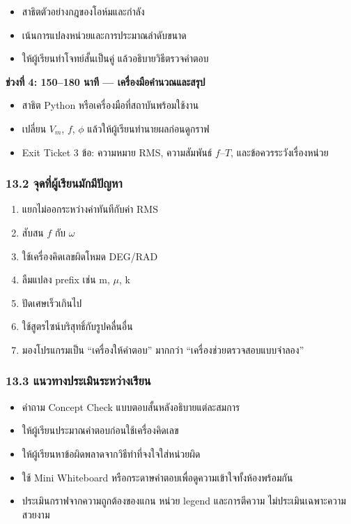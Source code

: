 \begin{itemize}
    \item สาธิตตัวอย่างกฎของโอห์มและกำลัง
    \item เน้นการแปลงหน่วยและการประมาณลำดับขนาด
    \item ให้ผู้เรียนทำโจทย์สั้นเป็นคู่ แล้วอธิบายวิธีตรวจคำตอบ
\end{itemize}

\textbf{ช่วงที่ 4: 150–180 นาที — เครื่องมือคำนวณและสรุป}

\begin{itemize}
    \item สาธิต Python หรือเครื่องมือที่สถาบันพร้อมใช้งาน
    \item เปลี่ยน $V_m$, $f$, $\phi$ แล้วให้ผู้เรียนทำนายผลก่อนดูกราฟ
    \item Exit Ticket 3 ข้อ: ความหมาย RMS, ความสัมพันธ์ $f$–$T$, และข้อควรระวังเรื่องหน่วย
\end{itemize}

\subsubsection{13.2 จุดที่ผู้เรียนมักมีปัญหา}

\begin{enumerate}
    \item แยกไม่ออกระหว่างค่าทันทีกับค่า RMS
    \item สับสน $f$ กับ $\omega$
    \item ใช้เครื่องคิดเลขผิดโหมด DEG/RAD
    \item ลืมแปลง prefix เช่น m, $\mu$, k
    \item ปัดเศษเร็วเกินไป
    \item ใช้สูตรไซน์บริสุทธิ์กับรูปคลื่นอื่น
    \item มองโปรแกรมเป็น “เครื่องให้คำตอบ” มากกว่า “เครื่องช่วยตรวจสอบแบบจำลอง”
\end{enumerate}

\subsubsection{13.3 แนวทางประเมินระหว่างเรียน}

\begin{itemize}
    \item คำถาม Concept Check แบบตอบสั้นหลังอธิบายแต่ละสมการ
    \item ให้ผู้เรียนประมาณคำตอบก่อนใช้เครื่องคิดเลข
    \item ให้ผู้เรียนหาข้อผิดพลาดจากวิธีทำที่จงใจใส่หน่วยผิด
    \item ใช้ Mini Whiteboard หรือกระดาษคำตอบเพื่อดูความเข้าใจทั้งห้องพร้อมกัน
    \item ประเมินกราฟจากความถูกต้องของแกน หน่วย legend และการตีความ ไม่ประเมินเฉพาะความสวยงาม
\end{itemize}

